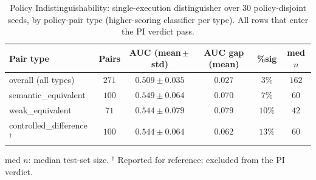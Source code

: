 \begin{table}[htbp]
  \caption{Policy Indistinguishability: single-execution distinguisher over 30
    policy-disjoint seeds, by policy-pair type (higher-scoring classifier per type).
    All rows that enter the PI verdict pass.}
  \label{tab:pi-pairs}
  \centering\footnotesize
  \begin{tabular}{lccccc}
    \toprule
    Pair type & Pairs & AUC (mean\,$\pm$\,std) & AUC gap (mean) & \%sig & med $n$ \\
    \midrule
    overall (all types)   & $271$ & $0.509 \pm 0.035$ & $0.027$ & $3\%$  & $162$ \\
    semantic\_equivalent  & $100$ & $0.549 \pm 0.064$ & $0.070$ & $7\%$  & $60$  \\
    weak\_equivalent      & $71$  & $0.544 \pm 0.079$ & $0.079$ & $10\%$ & $42$  \\
    controlled\_difference\,$^{\dagger}$ & $100$ & $0.544 \pm 0.064$ & $0.062$ & $13\%$ & $60$ \\
    \bottomrule
  \end{tabular}

  \begin{tablenote}
    med $n$: median test-set size. $^{\dagger}$ Reported for reference; excluded from the PI verdict.
  \end{tablenote}
\end{table}
